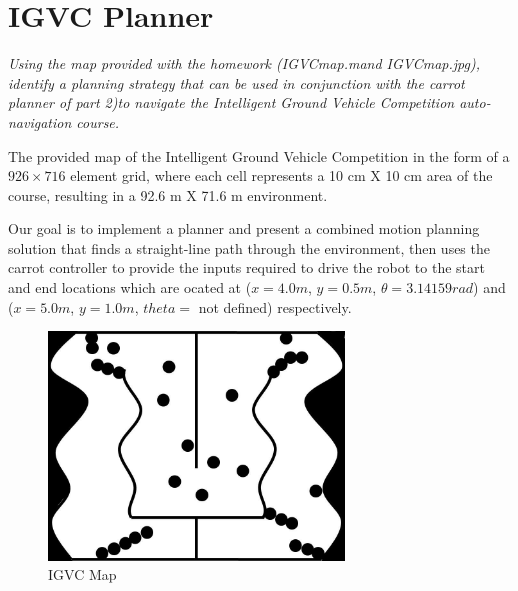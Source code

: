 \documentclass{article}
\begin{document}
\newpage
\section{IGVC Planner}
\label{sec:igvc_planner}
\textit{Using the map provided with the homework (IGVCmap.mand IGVCmap.jpg), identify a planning strategy that can be used in conjunction with the carrot planner of part 2)to navigate the Intelligent Ground Vehicle Competition auto-navigation course.}

The provided map of the Intelligent Ground Vehicle Competition in the form of a $926 \times 716$ element grid, where each cell
represents a 10 cm X 10 cm area of the course, resulting in a 92.6 m X 71.6 m environment. 

Our goal is to implement a planner and present a combined motion planning solution that finds a straight-line path through the environment, then uses the carrot controller to provide the inputs required to drive the robot to the start and end locations which are ocated at ($x = 4.0m$, $y = 0.5m$, $\theta = 3.14159 rad$) and ($x = 5.0 m$, $y = 1.0 m$, $theta =$ not defined) respectively. 


\begin{figure}[H]
	\centering
	\includegraphics[width=0.7\textwidth]{images/IGVCmap.jpg}
	\caption{IGVC Map}
	\label{fig:igvc_map}
\end{figure}
\end{document}

